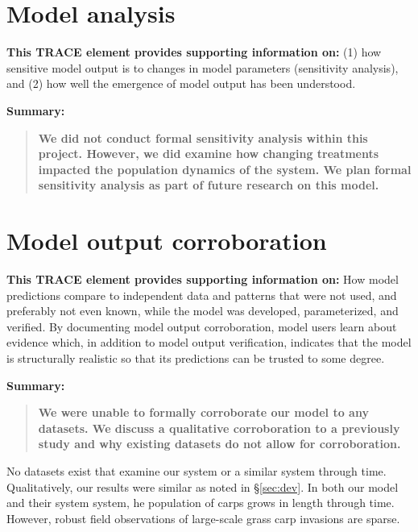 \documentclass{article}[12pt]
\begin{document}
\section{Model analysis}

\textbf{This TRACE element provides supporting information on:} (1) how sensitive model output is to changes in model parameters (sensitivity analysis), and (2) how well the emergence of model output has been understood. 

\textbf{Summary:}
\begin{verse}
\textbf{
We did not conduct formal sensitivity analysis within this project.
However, we did examine how changing treatments impacted the population dynamics of the system.
We plan formal sensitivity analysis as part of future research on this model.
}
\end{verse}

\section{Model output corroboration}

\textbf{This TRACE element provides supporting information on:}  How model predictions compare to independent data and patterns that were not used, and preferably not even known, while the model was developed, parameterized, and verified. By documenting model output corroboration, model users learn about evidence which, in addition to model output verification, indicates that the model is structurally realistic so that its predictions can be trusted to some degree. 

\textbf{Summary:}
\begin{verse}
\textbf{
We were unable to formally corroborate our model to any datasets.
We discuss a qualitative corroboration to a previously study and why existing datasets do not allow for corroboration.
}
\end{verse}

No datasets exist that examine our system or a similar system through time.
Qualitatively, our results were similar \citet{martyn1986mapping} as noted in \S \ref{sec:dev}.
In both our model and their system system, he population of carps grows in length through time. 
However, robust field observations of large-scale grass carp invasions are sparse. 




\end{document}
